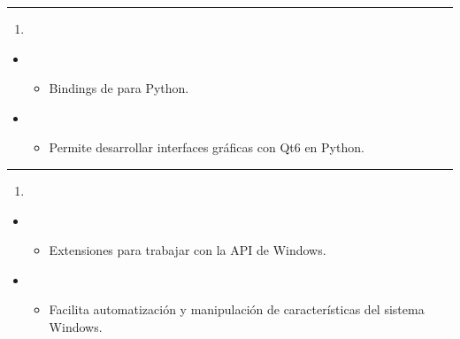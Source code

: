 \documentclass[a4paper,10pt,oneside,spanish,openany]{sphinxmanual}
\begin{document}
\bigskip\hrule\bigskip

\begin{enumerate}
%
\setcounter{enumi}{22}
\item {} 
\sphinxAtStartPar
{}

\end{enumerate}
\begin{itemize}
\item {} 
\sphinxAtStartPar
{}
\begin{itemize}
\item {} 
\sphinxAtStartPar
Bindings de  para Python.

\end{itemize}

\item {} 
\sphinxAtStartPar
{}
\begin{itemize}
\item {} 
\sphinxAtStartPar
Permite desarrollar interfaces gráficas con Qt6 en Python.

\end{itemize}

\end{itemize}


\bigskip\hrule\bigskip

\begin{enumerate}
%
\setcounter{enumi}{23}
\item {} 
\sphinxAtStartPar
{}

\end{enumerate}
\begin{itemize}
\item {} 
\sphinxAtStartPar
{}
\begin{itemize}
\item {} 
\sphinxAtStartPar
Extensiones para trabajar con la API de Windows.

\end{itemize}

\item {} 
\sphinxAtStartPar
{}
\begin{itemize}
\item {} 
\sphinxAtStartPar
Facilita automatización y manipulación de características del sistema Windows.

\end{itemize}

\end{itemize}
\end{document}
